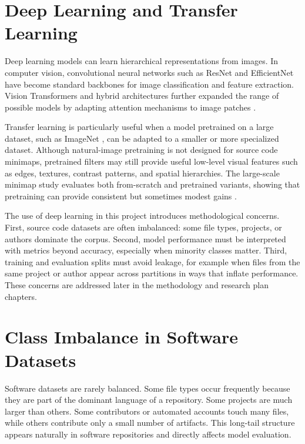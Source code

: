 \section{Deep Learning and Transfer Learning}

Deep learning models can learn hierarchical representations from images. In
computer vision, convolutional neural networks such as ResNet
\cite{he2016resnet} and EfficientNet \cite{tan2019efficientnet} have become
standard backbones for image classification and feature extraction. Vision
Transformers and hybrid architectures further expanded the range of possible
models by adapting attention mechanisms \cite{vaswani2017attention} to image
patches \cite{dosovitskiy2021vit}.

Transfer learning is particularly useful when a model pretrained on a large
dataset, such as ImageNet \cite{deng2009imagenet}, can be adapted to a smaller
or more specialized dataset. Although
natural-image pretraining is not designed for source code minimaps, pretrained
filters may still provide useful low-level visual features such as edges,
textures, contrast patterns, and spatial hierarchies. The large-scale minimap
study evaluates both from-scratch and pretrained variants, showing that
pretraining can provide consistent but sometimes modest gains
\cite{gebara2025ciarp}.

The use of deep learning in this project introduces methodological concerns.
First, source code datasets are often imbalanced: some file types, projects, or
authors dominate the corpus. Second, model performance must be interpreted with
metrics beyond accuracy, especially when minority classes matter. Third,
training and evaluation splits must avoid leakage, for example when files from
the same project or author appear across partitions in ways that inflate
performance. These concerns are addressed later in the methodology and research
plan chapters.

\section{Class Imbalance in Software Datasets}

Software datasets are rarely balanced. Some file types occur frequently because
they are part of the dominant language of a repository. Some projects are much
larger than others. Some contributors or automated accounts touch many files,
while others contribute only a small number of artifacts. This long-tail
structure appears naturally in software repositories and directly affects model
evaluation.

